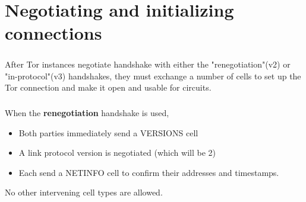 \chapter{Negotiating and initializing connections}


\paragraph{}
After Tor instances negotiate handshake with either the
"renegotiation"(v2) or "in-protocol"(v3) handshakes, they must exchange
a number of cells to set up the Tor connection  and make it
open and usable for circuits.

\paragraph{}
When the \textbf{renegotiation} handshake is used,
\begin{itemize}
    \item Both parties immediately send a VERSIONS cell
    \item A link protocol version is negotiated (which will be 2)
    \item Each send a NETINFO cell to confirm their addresses and timestamps.
\end{itemize}
No other intervening cell types are allowed.

